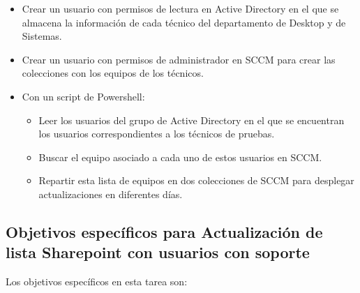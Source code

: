 \documentclass[a4paper, 12pt]{book}
\begin{document}
\begin{itemize}
\item Crear un usuario con permisos de lectura en Active Directory en el que se almacena la información de cada técnico del departamento de Desktop y de Sistemas.

\item Crear un usuario con permisos de administrador en SCCM para crear las colecciones con los equipos de los técnicos.

\item Con un script de Powershell:

	\begin{itemize}
		\item Leer los usuarios del grupo de Active Directory en el que se encuentran los usuarios correspondientes a los técnicos de pruebas.
		
		\item Buscar el equipo asociado a cada uno de estos usuarios en SCCM.
		
		\item Repartir esta lista de equipos en dos colecciones de SCCM para desplegar actualizaciones en diferentes días.
	\end{itemize}
\end{itemize}


\subsection{Objetivos específicos para Actualización de lista Sharepoint con usuarios con soporte}
\label{Objetivos específicos para Actualización de lista Sharepoint con usuarios con soporte}

Los objetivos específicos en esta tarea son:
\end{document}
